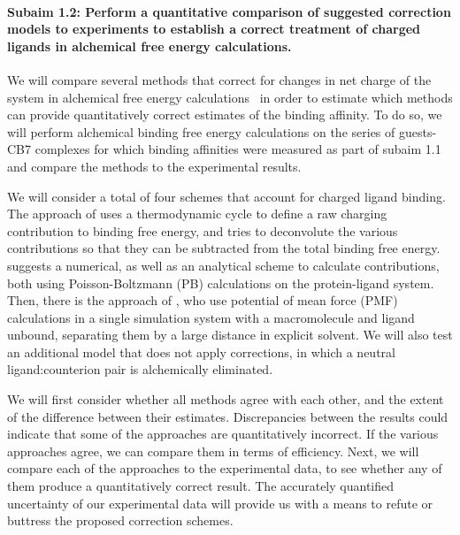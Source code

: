 \documentclass[10pt,final]{article}
\newcommand{\subsubsubsection}[1]{\paragraph*{#1}}
\begin{document}
\subsubsubsection{Subaim 1.2: Perform a quantitative comparison of suggested correction models to experiments to establish a correct treatment of charged ligands in alchemical free energy calculations.}
We will compare several methods that correct for changes in net charge of the system in alchemical free energy calculations~\autocite{Reif2013a,Rocklin2013a, Lin2014a} in order to estimate which methods can provide quantitatively correct estimates of the binding affinity.
%
To do so, we will perform alchemical binding free energy calculations on the series of guests-CB7 complexes for which binding affinities were measured as part of subaim 1.1 and compare the methods to the experimental results.

We will consider a total of four schemes that account for charged ligand binding.
%
The approach of \textcite{Reif2013a} uses a thermodynamic cycle to define a raw charging contribution to binding free energy, and tries to deconvolute the various contributions so that they can be subtracted from the total binding free energy.
%
\textcite{Rocklin2013a} suggests a numerical, as well as an analytical scheme to calculate contributions, both using Poisson-Boltzmann (PB) calculations on the protein-ligand system.
%
Then, there is the approach of \textcite{Lin2014a}, who use potential of mean force (PMF) calculations in a single simulation system with a macromolecule and ligand unbound, separating them by a large distance in explicit solvent.
%
We will also test an additional model that does not apply corrections, in which a neutral ligand:counterion pair is alchemically eliminated. 


%
We will first consider whether all methods agree with each other, and the extent of the difference between their estimates.
%
Discrepancies between the results could indicate that some of the approaches are quantitatively incorrect.
%
If the various approaches agree, we can compare them in terms of efficiency.
%
Next, we will compare each of the approaches to the experimental data, to see whether any of them produce a quantitatively correct result.
%
The accurately quantified uncertainty of our experimental data will provide us with a means to refute or buttress the proposed correction schemes.
\end{document}

